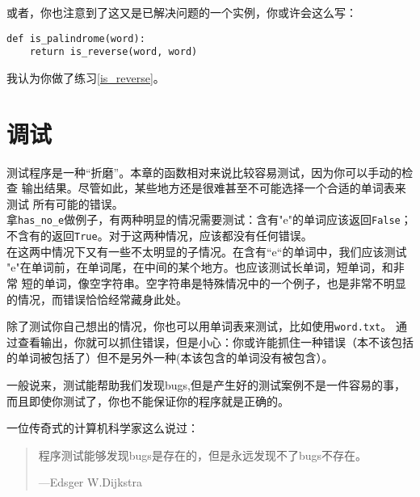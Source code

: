 或者，你也注意到了这又是已解决问题的一个实例，你或许会这么写：

\beforeverb
\begin{verbatim}
def is_palindrome(word):
    return is_reverse(word, word)
\end{verbatim}
\afterverb


我认为你做了练习\ref{is_reverse}。

\section{调试}


测试程序是一种“折磨”。本章的函数相对来说比较容易测试，因为你可以手动的检查
输出结果。尽管如此，某些地方还是很难甚至不可能选择一个合适的单词表来测试
所有可能的错误。\\


拿\verb"has_no_e"做例子，有两种明显的情况需要测试：含有"e"的单词应该返回{\tt False}；不含有的返回{\tt True}。对于这两种情况，应该都没有任何错误。\\


在这两中情况下又有一些不太明显的子情况。在含有“e“的单词中，我们应该测试
"e"在单词前，在单词尾，在中间的某个地方。也应该测试长单词，短单词，和非常
短的单词，像空字符串。空字符串是特殊情况中的一个例子，也是非常不明显的情况，而错误恰恰经常藏身此处。


除了测试你自己想出的情况，你也可以用单词表来测试，比如使用{\tt word.txt}。
通过查看输出，你就可以抓住错误，但是小心：你或许能抓住一种错误（本不该包括
的单词被包括了）但不是另外一种(本该包含的单词没有被包含）。

一般说来，测试能帮助我们发现bugs,但是产生好的测试案例不是一件容易的事，
而且即使你测试了，你也不能保证你的程序就是正确的。


一位传奇式的计算机科学家这么说过：

\begin{quote}
程序测试能够发现bugs是存在的，但是永远发现不了bugs不存在。

---Edsger W.Dijkstra
\end{quote}


